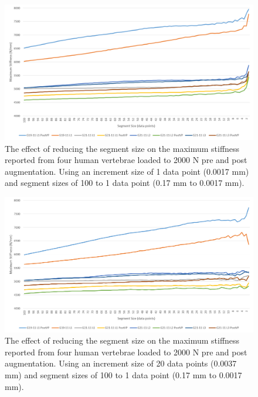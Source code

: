 \begin{figure}[ht!]
  \centering
 
\includegraphics[width=6in]{Chapters/Chapter_HT_images/findStiffness_1incr.png}

 \caption{The effect of reducing the segment size on the maximum stiffness
    reported from four human vertebrae loaded to 2000 N pre and post
    augmentation. Using an increment size of 1 data point (0.0017 mm) and
    segment sizes of 100 to 1 data point (0.17 mm to 0.0017 mm).}
  \label{fig:findStiffness_1incr}
\end{figure}

\begin{figure}[ht!]
  \centering
 
\includegraphics[width=6in]{Chapters/Chapter_HT_images/findStiffness_20incr.png}
  \caption{The effect of reducing the segment size on the maximum stiffness
    reported from four human vertebrae loaded to 2000 N pre and post
    augmentation. Using an increment size of 20 data points (0.0037 mm) and
    segment sizes of 100 to 1 data point (0.17 mm to 0.0017 mm).}
  \label{fig:findStiffness_20incr}
\end{figure}

